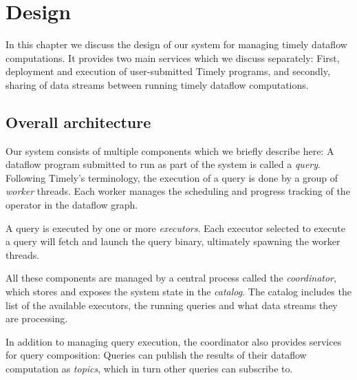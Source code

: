 \chapter{Design}\label{ch:design}

In this chapter we discuss the design of our system for managing timely dataflow
computations. It provides two main services which we discuss separately:
First, deployment and execution of user-submitted Timely programs, and secondly,
sharing of data streams between running timely dataflow computations.

\section{Overall architecture}

Our system consists of multiple components which we briefly describe here:
A dataflow program submitted to run as part of the system is
called a \emph{query}. Following Timely's terminology, the execution of a query
is done by a group of \emph{worker} threads. Each worker manages the scheduling and
progress tracking of the operator in the dataflow graph. 

A query is executed by one or more \emph{executors}. Each executor selected to
execute a query will fetch and launch the query binary, ultimately spawning the
worker threads.

All these components are managed by a central process called the \emph{coordinator},
which stores and exposes the system state in the \emph{catalog}. The catalog includes
the list of the available executors, the running queries and what data streams they
are processing.

In addition to managing query execution, the coordinator also provides services
for query composition: Queries can publish the results of their dataflow
computation as \emph{topics}, which in turn other queries can subscribe to.

